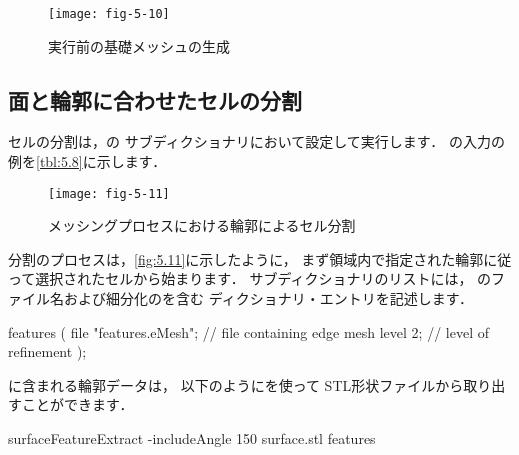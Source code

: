 \begin{figure}[ht]
 \texttt{[image: fig-5-10]}
 \caption{実行前の基礎メッシュの生成}
 \label{fig:5.10}
\end{figure}


\subsection{面と輪郭に合わせたセルの分割}
\label{ssec:5.4.3}
%
セルの分割は，の
%
%
サブディクショナリにおいて設定して実行します．
の入力の例を\autoref{tbl:5.8}に示します．


\begin{table}[ht]
 
 \caption{の
%
%
 サブディクショナリのキーワード}
 \label{tbl:5.8}
\end{table}


\begin{figure}[ht]
 \texttt{[image: fig-5-11]}
 \caption{メッシングプロセスにおける輪郭によるセル分割}
 \label{fig:5.11}
\end{figure}


分割のプロセスは，\autoref{fig:5.11}に示したように，
まず領域内で指定された輪郭に従って選択されたセルから始まります．
サブディクショナリのリストには，
のファイル名および細分化のを含む
ディクショナリ・エントリを記述します．
\begin{OFverbatim}[file]
features
(
    {
        file "features.eMesh"; // file containing edge mesh
        level 2;               // level of refinement
    }
);
\end{OFverbatim}
に含まれる輪郭データは，
以下のようにを使って
STL形状ファイルから取り出すことができます．
\begin{OFverbatim}[terminal]
surfaceFeatureExtract -includeAngle 150 surface.stl features
\end{OFverbatim}


